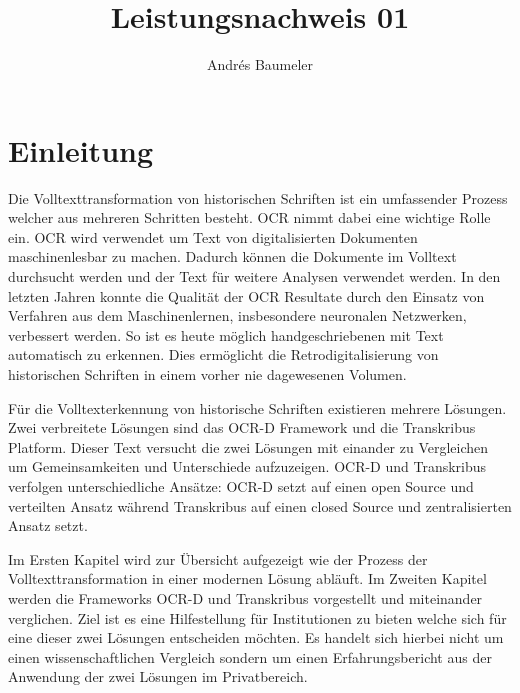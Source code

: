 \documentclass[a4paper,oneside, 12pt]{report}
\title{Leistungsnachweis 01}
\author{Andrés Baumeler}
\begin{document}

\pagestyle{empty} %





\cleardoublepage
\tableofcontents %
\cleardoublepage %

\pagestyle{plain} %



\chapter{Einleitung}\label{sec:motivation}
Die Volltexttransformation von historischen Schriften ist ein umfassender Prozess welcher aus mehreren Schritten besteht. \ac{OCR} nimmt dabei eine wichtige Rolle ein. \ac{OCR}  wird verwendet um Text von digitalisierten Dokumenten maschinenlesbar zu machen. Dadurch können die Dokumente im Volltext durchsucht werden und der Text für weitere Analysen verwendet werden. In den letzten Jahren konnte die Qualität der OCR Resultate durch den Einsatz von Verfahren aus dem Maschinenlernen, insbesondere neuronalen Netzwerken, verbessert werden. So ist es heute möglich handgeschriebenen mit Text automatisch zu erkennen. Dies ermöglicht die Retrodigitalisierung von historischen Schriften in einem vorher nie dagewesenen Volumen. 

Für die Volltexterkennung von historische Schriften existieren mehrere Lösungen. Zwei verbreitete Lösungen sind das OCR-D Framework und die Transkribus Platform. Dieser Text versucht die zwei Lösungen mit einander zu Vergleichen um Gemeinsamkeiten und Unterschiede aufzuzeigen. OCR-D und Transkribus verfolgen unterschiedliche Ansätze: OCR-D setzt auf einen open Source und verteilten Ansatz während Transkribus auf einen closed Source und zentralisierten Ansatz setzt.

Im Ersten Kapitel wird zur Übersicht aufgezeigt wie der Prozess der Volltexttransformation in einer modernen Lösung abläuft. Im Zweiten Kapitel werden die Frameworks OCR-D und Transkribus vorgestellt und miteinander verglichen. Ziel ist es eine Hilfestellung für Institutionen zu bieten welche sich für eine dieser zwei Lösungen entscheiden möchten. Es handelt sich hierbei nicht um einen wissenschaftlichen Vergleich sondern um einen Erfahrungsbericht aus der Anwendung der zwei Lösungen im Privatbereich. 
\end{document}
